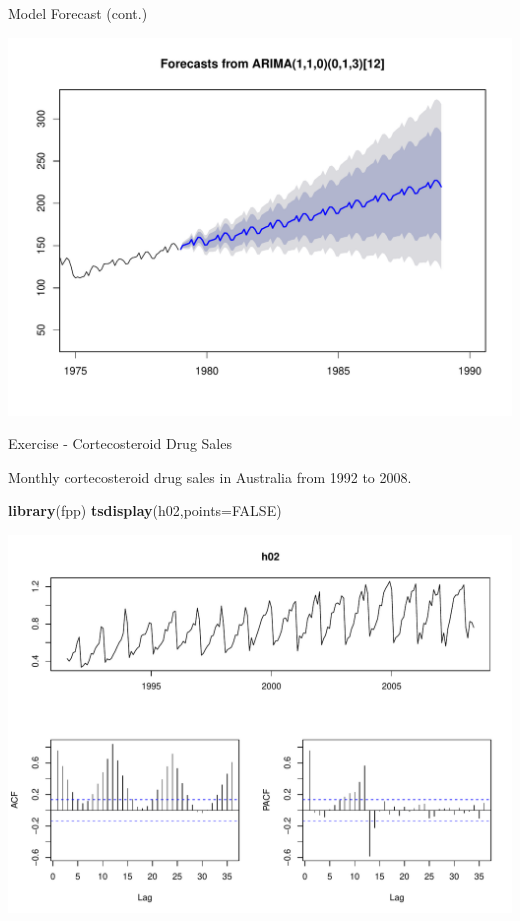 \documentclass[11pt,ignorenonframetext,]{beamer}
\newenvironment{Shaded}{}{}
\newcommand{\KeywordTok}[1]{\textcolor[rgb]{0.00,0.44,0.13}{\textbf{#1}}}
\newcommand{\DataTypeTok}[1]{\textcolor[rgb]{0.56,0.13,0.00}{#1}}
\newcommand{\OtherTok}[1]{\textcolor[rgb]{0.00,0.44,0.13}{#1}}
\newcommand{\NormalTok}[1]{#1}
\let\oldShaded\Shaded
\let\endoldShaded\endShaded
\renewenvironment{Shaded}{\footnotesize\begin{spacing}{0.9}\oldShaded}{\endoldShaded\end{spacing}}
\begin{document}
\begin{frame}{Model Forecast (cont.)}

\includegraphics{Lec11_files/figure-beamer/unnamed-chunk-29-1.pdf}

\end{frame}

\begin{frame}[fragile]{Exercise - Cortecosteroid Drug Sales}

Monthly cortecosteroid drug sales in Australia from 1992 to 2008.

\begin{Shaded}
\begin{Highlighting}[]
\KeywordTok{library}\NormalTok{(fpp)}
\KeywordTok{tsdisplay}\NormalTok{(h02,}\DataTypeTok{points=}\OtherTok{FALSE}\NormalTok{)}
\end{Highlighting}
\end{Shaded}

\includegraphics{Lec11_files/figure-beamer/unnamed-chunk-30-1.pdf}

\end{frame}
\end{document}
